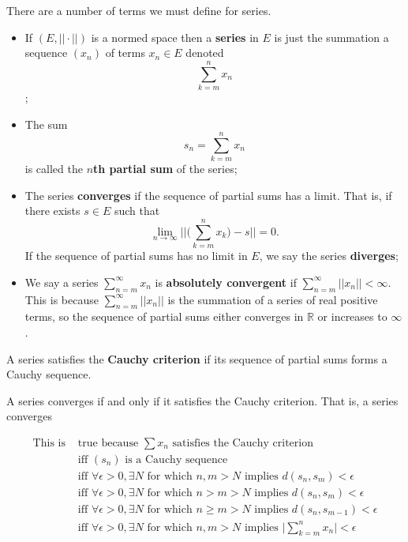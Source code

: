 \begin{defn}
There are a number of terms we must define for series.
\begin{itemize}
\item If $(E, ||\cdot||)$ is a normed space then a \textbf{series} in $E$ is just the summation a sequence $(x_n)$ of terms $x_n \in E$ denoted \[\sum_{k=m}^{n}x_n\];
\item The sum 
\[s_n = \sum_{k=m}^{n}x_n\]
is called the \textbf{$n$th partial sum} of the series;
\item The series \textbf{converges} if the sequence of partial sums has a limit.  That is, if there exists $s \in E$ such that
\[\lim_{n \rightarrow \infty} \biggl|\biggl|\biggl(\sum_{k=m}^{n}x_k\biggr) - s\biggr|\biggr| = 0.\]
If the sequence of partial sums has no limit in $E$, we say the series \textbf{diverges};
\item We say a series $\sum_{n=m}^\infty x_n$ is \textbf{absolutely convergent} if $\sum_{n=m}^\infty ||x_n|| < \infty$.  This is because $\sum_{n=m}^\infty ||x_n||$ is the summation of a series of real positive terms, so the sequence of partial sums either converges in $\mathbb{R}$ or increases to $\infty$.
\end{itemize}
\end{defn}

\begin{defn}
A series satisfies the \textbf{Cauchy criterion} if its sequence of partial sums forms a Cauchy sequence.
\end{defn}

\begin{lemma}
A series converges if and only if it satisfies the Cauchy criterion.  That is, a series converges
\end{lemma}

\begin{align*}
\textrm{This is }&\textrm{true because } \sum x_n \textrm{ satisfies the Cauchy criterion}\\
&\textrm{iff } (s_n) \textrm{ is a Cauchy sequence}\\
&\textrm{iff } \forall\epsilon > 0, \exists N \textrm{ for which } n,m > N \textrm{ implies } d(s_n, s_m) < \epsilon\\
&\textrm{iff } \forall\epsilon > 0, \exists N \textrm{ for which } n>m > N \textrm{ implies } d(s_n, s_m) < \epsilon\\
&\textrm{iff } \forall\epsilon > 0, \exists N \textrm{ for which } n\geq m > N \textrm{ implies } d(s_n, s_{m-1}) < \epsilon\\
&\textrm{iff } \forall\epsilon > 0, \exists N \textrm{ for which } n,m > N \textrm{ implies } \bigl|\sum_{k=m}^{n}x_n\bigr| < \epsilon\\
\end{align*}


